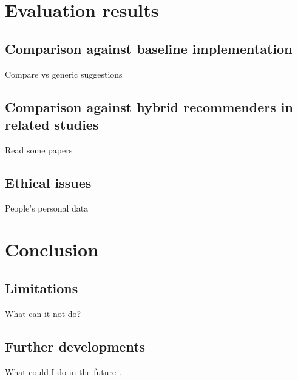 \documentclass[conference]{IEEEtran}
\begin{document}
\section{Evaluation results}

\subsection{Comparison against baseline implementation}
Compare vs generic suggestions

\subsection{Comparison against hybrid recommenders in related studies}
Read some papers

\subsection{Ethical issues}
People's personal data


\section{Conclusion}

\subsection{Limitations}
What can it not do?

\subsection{Further developments}
What could I do in the future \cite{5284958}. 




\end{document}
